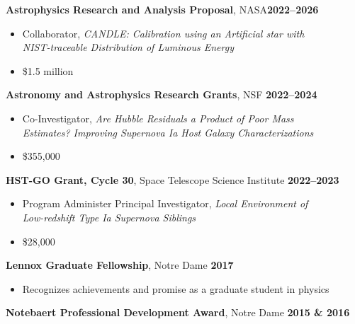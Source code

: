 \documentclass[margin]{res}
\begin{document}
\begin{resume}
\textbf{Astrophysics Research and Analysis Proposal}, NASA\hfill {\bf 2022--2026}
\begin{itemize}  \itemsep -2pt %
     \item[] Collaborator, \textit{CANDLE: Calibration using an Artificial star with\\NIST-traceable Distribution of Luminous Energy}
     \item[] \$1.5 million
    \end{itemize} \vspace{-12pt}
\textbf{Astronomy and Astrophysics Research Grants}, NSF \hfill \textbf{2022--2024}
\begin{itemize}  \itemsep -2pt %
     \item[] Co-Investigator, \textit{Are Hubble Residuals a Product of Poor Mass\\Estimates? Improving Supernova Ia Host Galaxy Characterizations} 
     \item[] \$355,000
    \end{itemize} \vspace{-12pt}
\textbf{HST-GO Grant, Cycle 30}, Space Telescope Science Institute \hfill \textbf{2022--2023}
\begin{itemize}  \itemsep -2pt %
     \item[] Program Administer Principal Investigator, \textit{Local Environment of\\Low-redshift Type Ia Supernova Siblings} 
     \item[] \$28,000
    \end{itemize} \vspace{-12pt}
{\bf Lennox Graduate Fellowship}, Notre Dame \hfill {\bf 2017}
    \begin{itemize}  \itemsep -2pt %
     \item[] Recognizes achievements and promise as a graduate student in physics
    \end{itemize} \vspace{-12pt}
{\bf Notebaert Professional Development Award}, Notre Dame \hfill {\bf 2015 \& 2016}

\end{resume}
\end{document}
